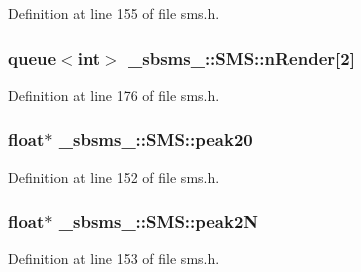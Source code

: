 Definition at line 155 of file sms.\+h.

\subsubsection[{\texorpdfstring{n\+Render}{nRender}}]{\setlength{\rightskip}{0pt plus 5cm}queue$<${\bf int}$>$ \+\_\+sbsms\+\_\+\+::\+S\+M\+S\+::n\+Render\mbox{[}2\mbox{]}\hspace{0.3cm}{\ttfamily [protected]}}\hypertarget{class__sbsms___1_1_s_m_s_aeb589c7707f9e70f93a6c511b349fd1d}{}\label{class__sbsms___1_1_s_m_s_aeb589c7707f9e70f93a6c511b349fd1d}


Definition at line 176 of file sms.\+h.

\subsubsection[{\texorpdfstring{peak20}{peak20}}]{\setlength{\rightskip}{0pt plus 5cm}float$\ast$ \+\_\+sbsms\+\_\+\+::\+S\+M\+S\+::peak20\hspace{0.3cm}{\ttfamily [protected]}}\hypertarget{class__sbsms___1_1_s_m_s_a4be8459f645d06dd0ae4ab47ac06e0be}{}\label{class__sbsms___1_1_s_m_s_a4be8459f645d06dd0ae4ab47ac06e0be}


Definition at line 152 of file sms.\+h.

\subsubsection[{\texorpdfstring{peak2N}{peak2N}}]{\setlength{\rightskip}{0pt plus 5cm}float$\ast$ \+\_\+sbsms\+\_\+\+::\+S\+M\+S\+::peak2N\hspace{0.3cm}{\ttfamily [protected]}}\hypertarget{class__sbsms___1_1_s_m_s_adad8487033becd9e341058e128fc3828}{}\label{class__sbsms___1_1_s_m_s_adad8487033becd9e341058e128fc3828}


Definition at line 153 of file sms.\+h.

